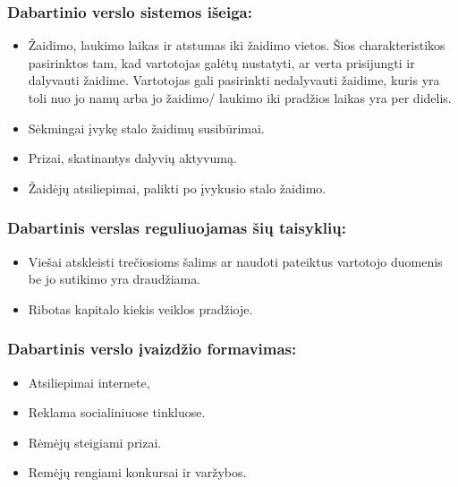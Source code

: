 \documentclass{VUMIFPSkursinis}
\begin{document}
	\subsubsection{Dabartinio verslo sistemos išeiga:}
		\renewcommand{\labelitemi}{$\bullet$}
			\begin{itemize}
				\item Žaidimo, laukimo laikas ir atstumas iki žaidimo vietos. 
				Šios charakteristikos pasirinktos tam, kad vartotojas galėtų 
				nustatyti, ar verta prisijungti ir dalyvauti žaidime. Vartotojas 
				gali pasirinkti nedalyvauti žaidime, kuris yra toli nuo jo namų 
				arba jo žaidimo/ laukimo iki pradžios laikas yra per didelis.
				\item Sėkmingai įvykę stalo žaidimų susibūrimai.
				\item Prizai, skatinantys dalyvių aktyvumą.
				\item Žaidėjų atsiliepimai, palikti po įvykusio stalo žaidimo.
			\end{itemize}
	\subsubsection{Dabartinis verslas reguliuojamas šių taisyklių:}
		\renewcommand{\labelitemi}{$\bullet$}
			\begin{itemize}
				\item Viešai atskleisti trečiosioms šalims ar naudoti pateiktus 
				vartotojo duomenis be jo sutikimo yra draudžiama.
				\item Ribotas kapitalo kiekis veiklos pradžioje.
			\end{itemize}
	\subsubsection{Dabartinis verslo įvaizdžio formavimas:}
		\renewcommand{\labelitemi}{$\bullet$}
			\begin{itemize}
				\item Atsiliepimai internete,
				\item Reklama socialiniuose tinkluose.
				\item Rėmėjų steigiami prizai.
				\item Remėjų rengiami konkursai ir varžybos.
			\end{itemize}
			
\end{document}
